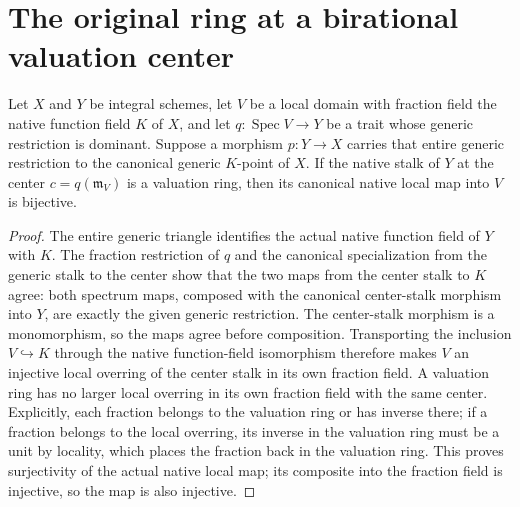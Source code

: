 \section{The original ring at a birational valuation center}
\begin{theorem}\label{thm:scheme-trait-center-original-ring}
Let $X$ and $Y$ be integral schemes, let $V$ be a local domain with fraction field the native function field $K$ of $X$, and let $q:\operatorname{Spec}V\to Y$ be a trait whose generic restriction is dominant. Suppose a morphism $p:Y\to X$ carries that entire generic restriction to the canonical generic $K$-point of $X$. If the native stalk of $Y$ at the center $c=q(\mathfrak m_V)$ is a valuation ring, then its canonical native local map into $V$ is bijective.
\leanok
\end{theorem}
\begin{proof}
The entire generic triangle identifies the actual native function field of $Y$ with $K$. The fraction restriction of $q$ and the canonical specialization from the generic stalk to the center show that the two maps from the center stalk to $K$ agree: both spectrum maps, composed with the canonical center-stalk morphism into $Y$, are exactly the given generic restriction. The center-stalk morphism is a monomorphism, so the maps agree before composition. Transporting the inclusion $V\hookrightarrow K$ through the native function-field isomorphism therefore makes $V$ an injective local overring of the center stalk in its own fraction field. A valuation ring has no larger local overring in its own fraction field with the same center. Explicitly, each fraction belongs to the valuation ring or has inverse there; if a fraction belongs to the local overring, its inverse in the valuation ring must be a unit by locality, which places the fraction back in the valuation ring. This proves surjectivity of the actual native local map; its composite into the fraction field is injective, so the map is also injective.
\end{proof}
